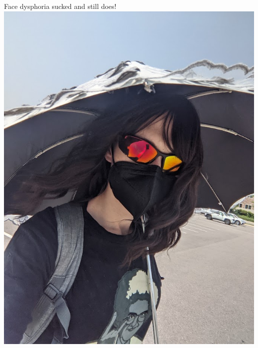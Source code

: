 \begin{frame}{Face dysphoria sucked and still does!}
\includegraphics{mae_pics/mae_umbrella.jpg}  
\end{frame}

